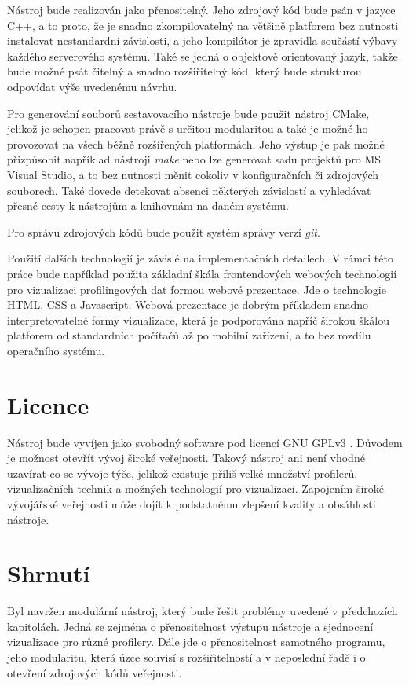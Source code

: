 \documentclass[czech,BP]{thesiskiv}
\begin{document}
Nástroj bude realizován jako přenositelný. Jeho zdrojový kód bude psán v jazyce C++, a to proto, že je snadno zkompilovatelný na většině platforem bez nutnosti instalovat nestandardní závislosti, a jeho kompilátor je zpravidla součástí výbavy každého serverového systému. Také se jedná o objektově orientovaný jazyk, takže bude možné psát čitelný a snadno rozšiřitelný kód, který bude strukturou odpovídat výše uvedenému návrhu.

Pro generování souborů sestavovacího nástroje bude použit nástroj CMake, jelikož je schopen pracovat právě s určitou modularitou a také je možné ho provozovat na všech běžně rozšířených platformách. Jeho výstup je pak možné přizpůsobit například nástroji \emph{make} nebo lze generovat sadu projektů pro MS Visual Studio, a to bez nutnosti měnit cokoliv v konfiguračních či zdrojových souborech. Také dovede detekovat absenci některých závislostí a vyhledávat přesné cesty k nástrojům a knihovnám na daném systému.

Pro správu zdrojových kódů bude použit systém správy verzí \emph{git}.

Použití dalších technologií je závislé na implementačních detailech. V rámci této práce bude například použita základní škála frontendových webových technologií pro vizualizaci profilingových dat formou webové prezentace. Jde o technologie HTML, CSS a Javascript. Webová prezentace je dobrým příkladem snadno interpretovatelné formy vizualizace, která je podporována napříč širokou škálou platforem od standardních počítačů až po mobilní zařízení, a to bez rozdílu operačního systému.

\section{Licence}

Nástroj bude vyvíjen jako svobodný software pod licencí GNU GPLv3 \cite{gplv3}. Důvodem je možnost otevřít vývoj široké veřejnosti. Takový nástroj ani není vhodné uzavírat co se vývoje týče, jelikož existuje příliš velké množství profilerů, vizualizačních technik a možných technologií pro vizualizaci. Zapojením široké vývojářské veřejnosti může dojít k podstatnému zlepšení kvality a obsáhlosti nástroje.

\section{Shrnutí}

Byl navržen modulární nástroj, který bude řešit problémy uvedené v předchozích kapitolách. Jedná se zejména o přenositelnost výstupu nástroje a sjednocení vizualizace pro různé profilery. Dále jde o přenositelnost samotného programu, jeho modularitu, která úzce souvisí s rozšiřitelností a v neposlední řadě i o otevření zdrojových kódů veřejnosti.
\end{document}
